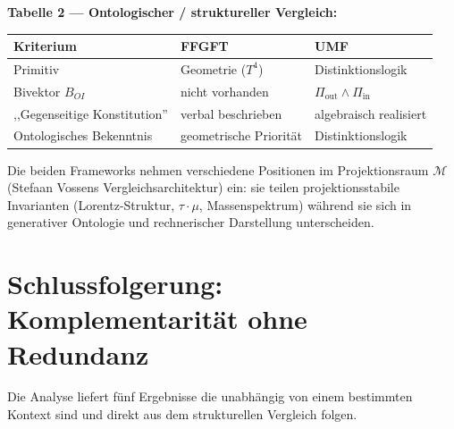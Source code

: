 \textbf{Tabelle 2 — Ontologischer / struktureller Vergleich:}

\begin{center}
\renewcommand{\arraystretch}{1.4}
{\small
\begin{tabular}{p{4cm}p{4cm}p{4cm}}
\toprule
\textbf{Kriterium} & \textbf{FFGFT} & \textbf{UMF} \\
\midrule
Primitiv & Geometrie ($T^4$) & Distinktionslogik \\
Bivektor $B_{OI}$ & nicht vorhanden & $\Pi_\text{out} \wedge \Pi_\text{in}$ \\
,,Gegenseitige Konstitution'' & verbal beschrieben & algebraisch realisiert \\
Ontologisches Bekenntnis & geometrische Priorität & Distinktionslogik \\
\bottomrule
\end{tabular}
}
\end{center}

Die beiden Frameworks nehmen verschiedene Positionen im Projektionsraum
$\mathcal{M}$ (Stefaan Vossens Vergleichsarchitektur) ein: sie teilen
projektionsstabile Invarianten (Lorentz-Struktur, $\tau\cdot\mu$,
Massenspektrum) während sie sich in generativer Ontologie und rechnerischer
Darstellung unterscheiden.

\section{Schlussfolgerung: Komplementarität ohne Redundanz}

Die Analyse liefert fünf Ergebnisse die unabhängig von einem bestimmten
Kontext sind und direkt aus dem strukturellen Vergleich folgen.

